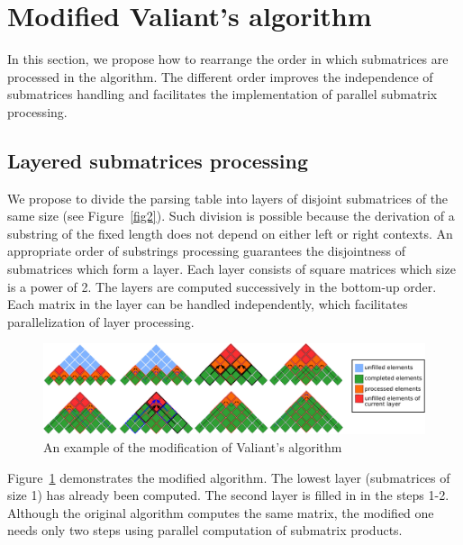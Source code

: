 \section{Modified Valiant's algorithm}

In this section, we propose how to rearrange the order in which submatrices are processed in the algorithm.
The different order improves the independence of submatrices handling and facilitates the implementation of parallel submatrix processing.

\subsection{Layered submatrices processing}

We propose to divide the parsing table into layers of disjoint submatrices of the same size (see Figure~\ref{fig2}).
Such division is possible because the derivation of a substring of the fixed length does not depend on either left or right contexts.
An appropriate order of substrings processing guarantees the disjointness of submatrices which form a layer.
Each layer consists of square matrices which size is a power of 2.
The layers are computed successively in the bottom-up order.
Each matrix in the layer can be handled independently, which facilitates parallelization of layer processing.

\begin{figure}[h]
\vspace{3mm}
 \begin{center}
 \includegraphics[width=12cm]{pictures/modivis2.pdf}
    \caption{An example of the modification of Valiant's algorithm}
    \label{fig4}
 \end{center}
\vspace{-8mm}
\end{figure}

Figure~\ref{fig4} demonstrates the modified algorithm.
The lowest layer (submatrices of size 1) has already been computed.
The second layer is filled in in the steps 1-2.
Although the original algorithm computes the same matrix, the modified one needs only two steps using parallel computation of submatrix products.

